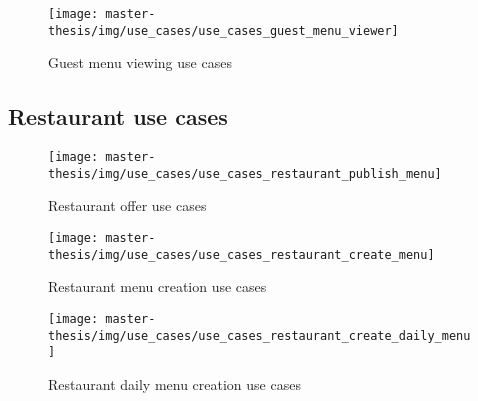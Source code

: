 \newpage

\begin{figure}[h]
  \centering
  \texttt{[image: master-thesis/img/use\_cases/use\_cases\_guest\_menu\_viewer]}
  \caption{Guest menu viewing use cases}
\end{figure}

\subsection{Restaurant use cases}

\begin{figure}[h]
  \centering
  \texttt{[image: master-thesis/img/use\_cases/use\_cases\_restaurant\_publish\_menu]}
  \caption{Restaurant offer use cases}
\end{figure}

\begin{figure}[h]
  \centering
  \texttt{[image: master-thesis/img/use\_cases/use\_cases\_restaurant\_create\_menu]}
  \caption{Restaurant menu creation use cases}
\end{figure}

\begin{figure}[h]
  \centering
  \texttt{[image: master-thesis/img/use\_cases/use\_cases\_restaurant\_create\_daily\_menu]}
  \caption{Restaurant daily menu creation use cases}
\end{figure}


